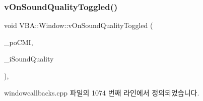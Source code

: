\subsubsection{\texorpdfstring{v\+On\+Sound\+Quality\+Toggled()}{vOnSoundQualityToggled()}}
{\footnotesize\ttfamily void V\+B\+A\+::\+Window\+::v\+On\+Sound\+Quality\+Toggled (\begin{DoxyParamCaption}\item[{Gtk\+::\+Check\+Menu\+Item $\ast$}]{\+\_\+po\+C\+MI,  }\item[{\mbox{\hyperlink{_util_8cpp_a0ef32aa8672df19503a49fab2d0c8071}{int}}}]{\+\_\+i\+Sound\+Quality }\end{DoxyParamCaption})\hspace{0.3cm}{\ttfamily [protected]}, {\ttfamily [virtual]}}



windowcallbacks.\+cpp 파일의 1074 번째 라인에서 정의되었습니다.


